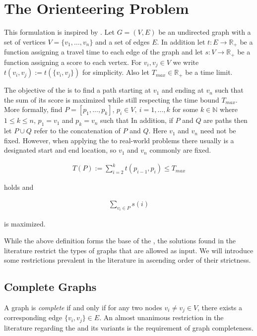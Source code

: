 \section{The Orienteering Problem} %
\label{sec:02:problem}

This formulation is inspired by \citeauthor{vansteenwegen_orienteering_2011} \cite{vansteenwegen_orienteering_2011}.
Let $G=(V,E)$ be an undirected graph with a set of vertices $V = \{v_1, \dots, v_n\}$ and a set of edges $E$.
In addition let $t: E \rightarrow \mathbb{R}_+$ be a function assigning a travel time to each edge of the graph and let
$s: V \rightarrow \mathbb{R}_+$ be a function assigning a score to each vertex.
For $v_i, v_j \in V$ we write $t(v_i, v_j) := t(\{v_i, v_j\})$ for simplicity.
Also let $T_{max} \in \mathbb{R}_+$ be a time limit.

The objective of the \oplong is to find a path starting at $v_1$ and ending at $v_n$
such that the sum of its score is maximized while still respecting the time bound $T_{max}$.
More formally, find $P = [p_1, \dots, p_k]$, $p_i \in V,\ i=1,\dots, k$ for some $k \in \mathbb{N}$ where $1 \leq k \leq n$,  $p_1 = v_1$ and $p_k = v_n$ such that
In addition, if $P$ and $Q$ are paths then let $P \cup Q$ refer to the concatenation of $P$ and $Q$.
Here $v_1$ and $v_n$ need not be fixed.
However, when applying the \op to real-world problems there usually is a designated start and end location,
so $v_1$ and $v_n$ commonly are fixed.

\begin{align*}
	T(P) := \sum_{i = 2}^k t(p_{i-1}, p_i) \leq T_{max}
\end{align*}

holds and

\begin{align*}
	\sum_{v_i \in P} s(i)
\end{align*}

is maximized.

While the above definition forms the base of the \op, the solutions found in the literature restrict the types of graphs that are allowed as input.
We will introduce some restrictions prevalent in the literature in ascending order of their strictness.

\subsection{Complete Graphs}
\label{subsec:02:complete}

A graph is \emph{complete} if and only if for any two nodes $v_i \neq v_j \in V$, there exists a corresponding edge $\{v_i, v_j\} \in E$.
An almost unanimous \cite{vansteenwegen_orienteering_2011} restriction in the literature regarding the \op and its variants is the requirement of graph completeness. \cite{szwarc_novel_2022,vansteenwegen_orienteering_2011,laporte_selective_1990,santini_hazardous_2022}

